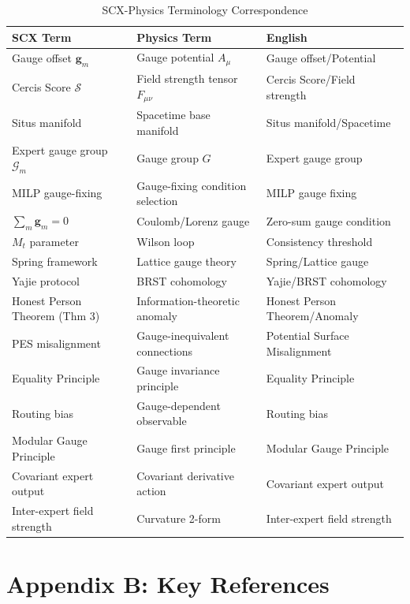 \documentclass[12pt,a4paper]{article}
\theoremstyle{remark}
\newcommand{\CercisScore}{\mathcal{S}}
\newcommand{\gaugeparam}{\mathbf{g}}
\newcommand{\calG}{\mathcal{G}}
\begin{document}
\begin{longtable}{p{5cm} p{5cm} p{4cm}}
\caption{SCX-Physics Terminology Correspondence}
\label{tab:glossary}\\
\toprule
\textbf{SCX Term} & \textbf{Physics Term} & \textbf{English} \\
\midrule
\endfirsthead
\midrule
\endfoot
\midrule
\endlastfoot
Gauge offset $\gaugeparam_m$ & Gauge potential $A_\mu$ & Gauge offset/Potential \\
Cercis Score $\CercisScore$ & Field strength tensor $F_{\mu\nu}$ & Cercis Score/Field strength \\
Situs manifold & Spacetime base manifold & Situs manifold/Spacetime \\
Expert gauge group $\calG_m$ & Gauge group $G$ & Expert gauge group \\
MILP gauge-fixing & Gauge-fixing condition selection & MILP gauge fixing \\
$\sum_m \gaugeparam_m = 0$ & Coulomb/Lorenz gauge & Zero-sum gauge condition \\
$M_t$ parameter & Wilson loop & Consistency threshold \\
Spring framework & Lattice gauge theory & Spring/Lattice gauge \\
Yajie protocol & BRST cohomology & Yajie/BRST cohomology \\
Honest Person Theorem (Thm 3) & Information-theoretic anomaly & Honest Person Theorem/Anomaly \\
PES misalignment & Gauge-inequivalent connections & Potential Surface Misalignment \\
Equality Principle & Gauge invariance principle & Equality Principle \\
Routing bias & Gauge-dependent observable & Routing bias \\
Modular Gauge Principle & Gauge first principle & Modular Gauge Principle \\
Covariant expert output & Covariant derivative action & Covariant expert output \\
Inter-expert field strength & Curvature 2-form & Inter-expert field strength \\
\bottomrule
\end{longtable}

\section*{Appendix B: Key References}
\end{document}
